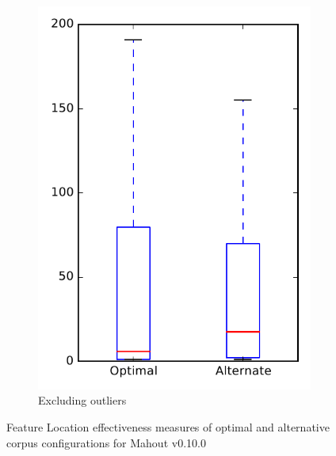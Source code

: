 \begin{figure}
\begin{subfigure}{.4\textwidth}
        \includegraphics[height=0.4\textheight]{figures/combo/flt_rq2_mahout_no_outlier}
        \caption{Excluding outliers}\label{fig:combo:flt:rq2:mahout_no_outlier}
    \end{subfigure}
\caption{Feature Location effectiveness measures of optimal and alternative corpus configurations for Mahout v0.10.0}
\label{fig:combo:flt:rq2:mahout}
\end{figure}
